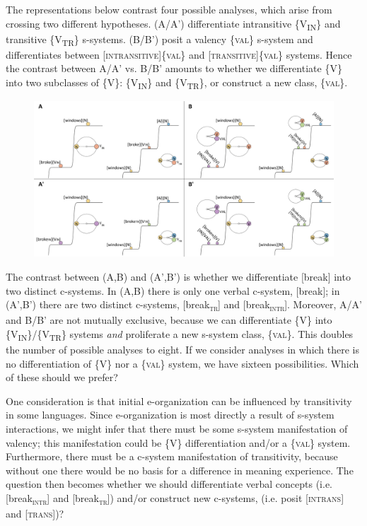   The representations below contrast four possible analyses, which arise from crossing two different hypotheses. (A/A') differentiate intransitive \{V\textsubscript{IN}\} and transitive \{V\textsubscript{TR}\} s-systems. (B/B') posit a valency \{\textsc{val}\} s-system and differentiates between [\textsc{intransitive}]\{\textsc{val}\} and [\textsc{transitive}]\{\textsc{val}\} systems. Hence the contrast between A/A' vs. B/B' amounts to whether we differentiate \{V\} into two subclasses of \{V\}: \{V\textsubscript{IN}\} and \{V\textsubscript{TR}\}, or construct a new class, \{\textsc{val}\}.

  
\begin{figure}
\includegraphics[width=\textwidth]{figures/Tilsen-img72.png}
\caption{\missingcaption}
\label{fig:}
\end{figure}
 

  The contrast between (A,B) and (A',B') is whether we differentiate [break] into two distinct c-systems. In (A,B) there is only one verbal c-system, [break]; in (A',B') there are two distinct c-systems, [break\textsc{\textsubscript{tr}}] and [break\textsc{\textsubscript{intr}}]. Moreover, A/A' and B/B' are not mutually exclusive, because we can differentiate \{V\} into \{V\textsubscript{IN}\}/\{V\textsubscript{TR}\} systems \textit{and} proliferate a new s-system class, \{\textsc{val}\}. This doubles the number of possible analyses to eight. If we consider analyses in which there is no differentiation of \{V\} nor a \{\textsc{val}\} system, we have sixteen possibilities. Which of these should we prefer? 

  One consideration is that initial e-organization can be influenced by transitivity in some languages. Since e-organization is most directly a result of s-system interactions, we might infer that there must be some s-system manifestation of valency; this manifestation could be \{V\} differentiation and/or a \{\textsc{val}\} system. Furthermore, there must be a c-system manifestation of transitivity, because without one there would be no basis for a difference in meaning experience. The question then becomes whether we should differentiate verbal concepts (i.e. [break\textsc{\textsubscript{intr}}] and [break\textsc{\textsubscript{tr}}]) and/or construct new c-systems, (i.e. posit [\textsc{intrans}] and [\textsc{trans}])?

